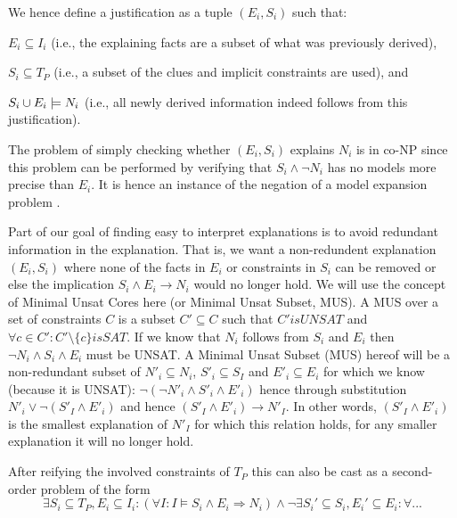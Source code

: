 We hence define a justification as a tuple $(E_i,S_i)$ such that: 
\begin{compactitem}
	\item $E_i\subseteq I_i$ (i.e., the explaining facts are a subset of what was previously derived),
	\item $S_i \subseteq T_P$ (i.e., a subset of the clues and implicit constraints are used), and 
	\item $S_i \cup E_i \models N_i$ (i.e., all newly derived information indeed follows from this justification).
\end{compactitem}

The problem of simply checking whether $(E_i,S_i)$ explains $N_i$ is in co-NP since this problem can be performed by verifying that $S_i \land \lnot N_i$ has no models more precise than $E_i$. It is hence an instance of the negation of a model expansion problem \cite{ternovskaMXcomplexity}.


Part of our goal of finding easy to interpret explanations is to avoid redundant information in the explanation. That is, we want a non-redundent explanation $(E_i,S_i)$ where none of the facts in $E_i$ or constraints in $S_i$ can be removed or else the implication $S_i \wedge E_i \rightarrow N_i$ would no longer hold. We will use the concept of Minimal Unsat Cores here (or Minimal Unsat Subset, MUS). A MUS over a set of constraints $C$ is a subset $C' \subseteq C$ such that $C' is UNSAT$ and $\forall c \in C': C' \setminus \{c\} is SAT$. If we know that $N_i$ follows from $S_i$ and $E_i$ then $\neg N_i \wedge S_i \wedge E_i$ must be UNSAT. A Minimal Unsat Subset (MUS) hereof will be a non-redundant subset of $N'_i \subseteq N_i$, $S'_i \subseteq S_I$ and $E'_i \subseteq E_i$ for which we know (because it is UNSAT): $\neg (\neg N'_i \wedge S'_i \wedge E'_i)$ hence through substitution $N'_i \vee \neg (S'_I \wedge E'_i)$ and hence $(S'_I \wedge E'_i) \rightarrow N'_I$. In other words, $(S'_I \wedge E'_i)$ is the smallest explanation of $N'_I$ for which this relation holds, for any smaller explanation it will no longer hold.

After reifying the involved constraints of $T_P$ this can also be cast as a second-order problem of the form
\[\exists S_i\subseteq T_P, E_i\subseteq I_i: (\forall I: I\models S_i\land E_i \Rightarrow N_i) \land \lnot \exists S_i'\subseteq S_i, E_i'\subseteq E_i: \forall ... \]


